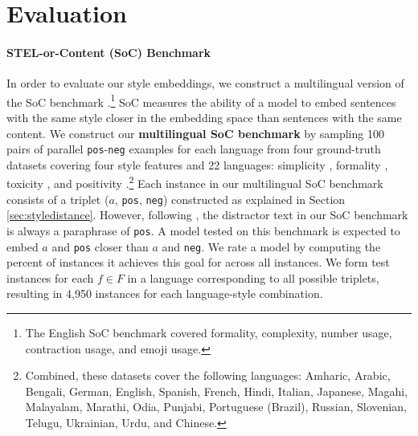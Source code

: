 \section{Evaluation}
\label{sec:evaluation}

\stelevaltable
\avevaltable

\paragraph{STEL-or-Content (SoC) Benchmark}

In order to evaluate our style embeddings, we construct a multilingual version of the SoC benchmark \citep{styleemb}.\footnote{The English SoC benchmark covered formality, complexity, number usage, contraction usage, and emoji usage.} SoC measures the ability of a model to embed sentences with the same style closer in the embedding space than sentences with the same content. We construct our \textbf{multilingual SoC benchmark} by sampling 100 pairs of parallel {\tt pos}-{\tt neg} examples for each language from four ground-truth datasets covering four style features and 22 languages: simplicity \citep{ryan-etal-2023-revisiting}, formality \citep{briakou-etal-2021-ola}, toxicity \citep{dementieva2024overview}, and positivity \citep{mukherjee2024multilingualtextstyletransfer}.\footnote{Combined, these datasets cover the following languages: Amharic, Arabic, Bengali, German, English, Spanish, French, Hindi, Italian, Japanese, Magahi, Malayalam, Marathi, Odia, Punjabi, Portuguese (Brazil), Russian, Slovenian, Telugu, Ukrainian, Urdu, and Chinese.} Each instance in our multilingual SoC benchmark consists of a triplet ($a$, {\tt pos}, {\tt neg}) constructed as explained in Section \ref{sec:styledistance}. However, following \citet{styleemb}, the distractor text in our SoC benchmark is always a paraphrase of {\tt pos}.
A model tested on this benchmark is expected to embed $a$ and {\tt pos} closer than $a$ and {\tt neg}. We rate a model by computing the percent of instances it achieves this goal for across all instances. We form test instances for each $f \in F$ in a language corresponding to all possible triplets, resulting in 4,950  instances for each language-style combination.

